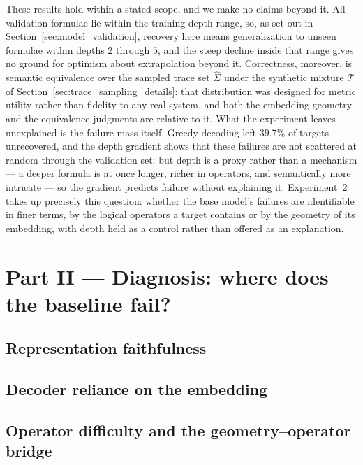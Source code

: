 \documentclass[titlepage,a4paper,11pt]{report}
\begin{document}
    These results hold within a stated scope, and we make no claims beyond it. All validation formulae lie within the training depth range, so, as set out in Section~\ref{sec:model_validation}, recovery here means generalization to unseen formulae within depths $2$ through $5$, and the steep decline inside that range gives no ground for optimism about extrapolation beyond it. Correctness, moreover, is semantic equivalence over the sampled trace set $\widehat\Sigma$ under the synthetic mixture $\mathcal{T}$ of Section~\ref{sec:trace_sampling_details}: that distribution was designed for metric utility rather than fidelity to any real system, and both the embedding geometry and the equivalence judgments are relative to it. What the experiment leaves unexplained is the failure mass itself. Greedy decoding left $39.7\%$ of targets unrecovered, and the depth gradient shows that these failures are not scattered at random through the validation set; but depth is a proxy rather than a mechanism --- a deeper formula is at once longer, richer in operators, and semantically more intricate --- so the gradient predicts failure without explaining it. Experiment~2 takes up precisely this question: whether the base model's failures are identifiable in finer terms, by the logical operators a target contains or by the geometry of its embedding, with depth held as a control rather than offered as an explanation.

    
    \section{Part II --- Diagnosis: where does the baseline fail?}\label{sec:geometry_analysis}
    
    
    \subsection{Representation faithfulness}\label{sec:rep_faithfulness}
    
    
    \subsection{Decoder reliance on the embedding}\label{sec:decoder_reliance}
    
    
    \subsection{Operator difficulty and the geometry--operator bridge}\label{sec:operator_difficulty}
    
\end{document}
